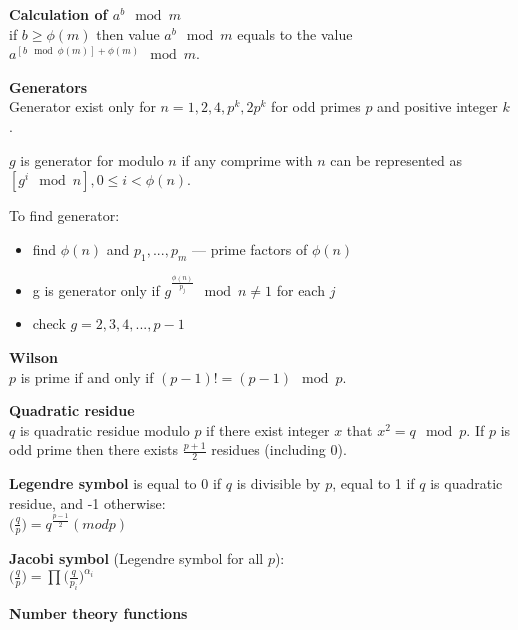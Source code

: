 \textbf{Calculation of $a^b \mod m$}\\
if $b \ge \phi(m)$ then value $a^b \mod m$ equals to the value $a^{\left[b \mod \phi(m)\right] + \phi(m)} \mod m$.

\textbf{Generators}\\
Generator exist only for $n = 1, 2, 4, p^k, 2p^k$ for odd primes $p$ and positive integer $k$. 

$g$ is generator for modulo $n$ if any comprime with $n$ can be represented as $\left[ g^i \mod n \right], 0 \le i < \phi(n)$.

To find generator:
\begin{itemize}
\item find $\phi(n)$ and $p_1, ..., p_m$ --- prime factors of $\phi(n)$
\item g is generator only if $g^{\frac{\phi(n)}{p_j}} \mod n \ne 1$ for each $j$
\item check $g = 2, 3, 4, ..., p - 1$
\end{itemize}


\textbf{Wilson}\\
$p$ is prime if and only if $(p - 1)! = (p - 1) \mod p$.

\textbf{Quadratic residue}\\
$q$ is quadratic residue modulo $p$ if there exist integer $x$ that $x^2 = q \mod p$.
If $p$ is odd prime then there exists $\frac{p + 1}{2}$ residues (including 0).

\textbf{Legendre symbol} is equal to 0 if $q$ is divisible by $p$, 
equal to 1 if $q$ is quadratic residue, and -1 otherwise:\\
$\Big(\frac{q}{p}\Big) = q^{\frac{p - 1}{2}} (mod p)$

\textbf{Jacobi symbol} (Legendre symbol for all $p$):\\
$\Big(\frac{q}{p}\Big) = \prod{\Big(\frac{q}{p_i}\Big)^{\alpha_i}}$

\textbf{Number theory functions}


